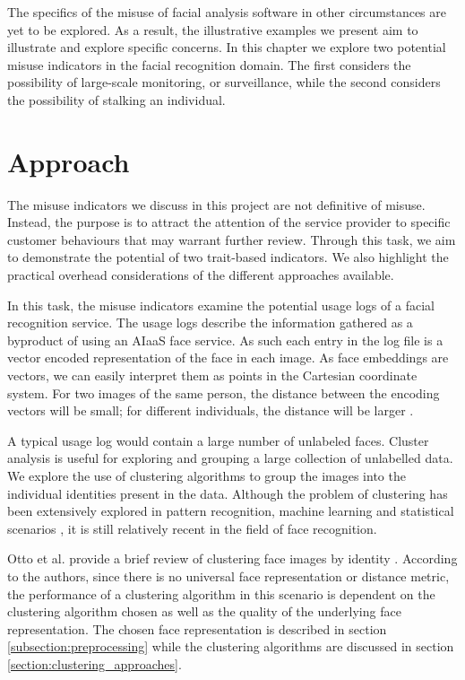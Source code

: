 \documentclass[a4paper,12pt]{report}
\begin{document}
The specifics of the misuse of facial analysis software in other circumstances are yet to be explored. As a result, the illustrative examples we present aim to illustrate and explore specific concerns. In this chapter we explore two potential misuse indicators in the facial recognition domain. The first considers the possibility of large-scale monitoring, or surveillance, while the second considers the possibility of stalking an individual.

\section{Approach}
The misuse indicators we discuss in this project are not definitive of misuse. Instead, the purpose is to attract the attention of the service provider to specific customer behaviours that may warrant further review. Through this task, we aim to demonstrate the potential of two trait-based indicators. We also highlight the practical overhead considerations of the different approaches available.

In this task, the misuse indicators examine the potential usage logs of a facial recognition service. The usage logs describe the information gathered as a byproduct of using an AIaaS face service. As such each entry in the log file is a vector encoded representation of the face in each image. As face embeddings are vectors, we can easily interpret them as points in the Cartesian coordinate system. For two images of the same person, the distance between the encoding vectors will be small; for different individuals, the distance will be larger \cite{schroff2015facenet}.

A typical usage log would contain a large number of unlabeled faces. Cluster analysis is useful for exploring and grouping a large collection of unlabelled data. We explore the use of clustering algorithms to group the images into the individual identities present in the data. Although the problem of clustering has been extensively explored in pattern recognition, machine learning and statistical scenarios \cite{jain2010data}, it is still relatively recent in the field of face recognition. 

Otto et al. provide a brief review of clustering face images by identity \cite{otto2017clustering}. According to the authors, since there is no universal face representation or distance metric, the performance of a clustering algorithm in this scenario is dependent on the clustering algorithm chosen as well as the quality of the underlying face representation. The chosen face representation is described in section \ref{subsection:preprocessing} while the clustering algorithms are discussed in section \ref{section:clustering_approaches}.
\end{document}
